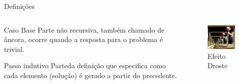 \documentclass[10pt]{beamer}
\newcommand{\duascolunas}[2]{
  \begin{columns}[t]
    \begin{column}{6cm}
      #1
    \end{column}
    \begin{column}{6cm}
      #2
    \end{column}
  \end{columns}
}
\begin{document}
\begin{frame}{Definições}
  \duascolunas{\begin{block}{Caso Base}
      Parte não recursiva, também chamado de âncora, ocorre quando a resposta para o problema é trivial.
    \end{block}
    \vfill
    \begin{block}{Passo indutivo}
      Parteda definição que especifica como cada elemento (solução) é gerado a partir do precedente.
    \end{block}}{
    \begin{figure}[h]
      \begin{center}
        \includegraphics[width=5cm]{fig/droste.jpeg}
        \caption{Efeito Droste}
      \end{center}
    \end{figure}
  }
\end{frame}
\end{document}

